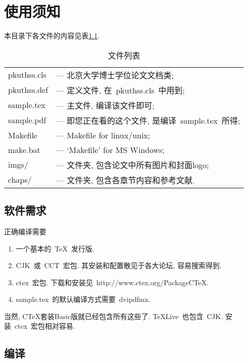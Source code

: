 \chapter{使用须知}\label{chap:notes}

本目录下各文件的内容见表\ref{tab:filelist}.
\begin{table}[h]
\begin{tabular}{ll}\hline
   pkuthss.cls  & --- 北京大学博士学位论文文档类;\\
   pkuthss.def  & --- 定义文件, 在~pkuthss.cls~中用到;\\
   sample.tex   & --- 主文件, 编译该文件即可;\\
   sample.pdf   & --- 即您正在看的这个文件, 是编译~sample.tex~所得;\\
   Makefile     & --- Makefile for linux/unix;\\
   make.bat     & --- `Makefile' for MS Windows;\\
   imgs/        & --- 文件夹, 包含论文中所有图片和封面logo;\\
   chaps/       & --- 文件夹, 包含各章节内容和参考文献.\\ \hline
\end{tabular}
\caption{文件列表}\label{tab:filelist}
\end{table}

\section{软件需求}\label{sec:requirement}

正确编译需要
\begin{enumerate}
\item 一个基本的~\TeX~发行版.
\item CJK~或~CCT~宏包. 其安装和配置散见于各大论坛, 容易搜索得到.
\item ctex~宏包. 下载和安装见~http://www.ctex.org/PackageCTeX.
\item sample.tex~的默认编译方式需要~dvipdfmx.
\end{enumerate}

当然, CTeX套装Basic版就已经包含所有这些了.
TeXLive~也包含~CJK. 安装~ctex~宏包相对容易.

\section{编译}\label{sec:compile}

